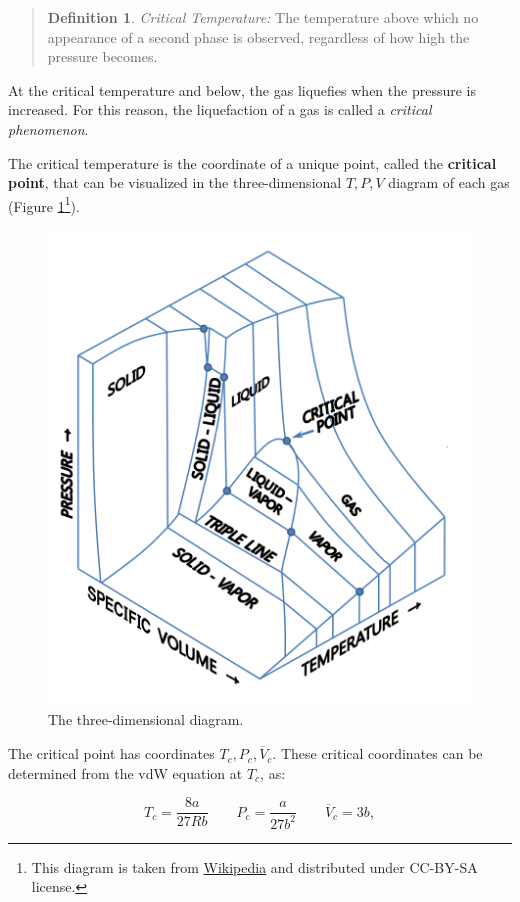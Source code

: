 \documentclass[
  9pt,
]{extbook}
\theoremstyle{definition}
\newtheorem{definition}{Definition}[chapter]
\theoremstyle{definition}
\theoremstyle{definition}
\theoremstyle{remark}
\begin{document}
\begin{quote}
\begin{definition}
\protect\hypertarget{def:criticalT}{}{\label{def:criticalT} }\emph{Critical Temperature:} The temperature above which no appearance of a second phase is observed, regardless of how high the pressure becomes.
\end{definition}
\end{quote}

At the critical temperature and below, the gas liquefies when the pressure is increased. For this reason, the liquefaction of a gas is called a \emph{critical phenomenon}.

The critical temperature is the coordinate of a unique point, called the \textbf{critical point}, that can be visualized in the three-dimensional \(T,P,V\) diagram of each gas (Figure \ref{fig:FigTPVd}\footnote{This diagram is taken from \href{https://en.wikipedia.org}{Wikipedia} and distributed under CC-BY-SA license.}).

\begin{figure}

{\centering \includegraphics[width=0.5\linewidth]{./img/PVT_3D_diagram} 

}

\caption{The three-dimensional diagram.}\label{fig:FigTPVd}
\end{figure}

The critical point has coordinates \({T_c,P_c, \overline{V}_c}\). These critical coordinates can be determined from the vdW equation at \(T_c\), as:

\begin{equation}
T_c=\frac{8a}{27Rb} \qquad P_c=\frac{a}{27b^2} \qquad \overline{V}_c=3b, 
\label{eq:criticpt}
\end{equation}
\end{document}
